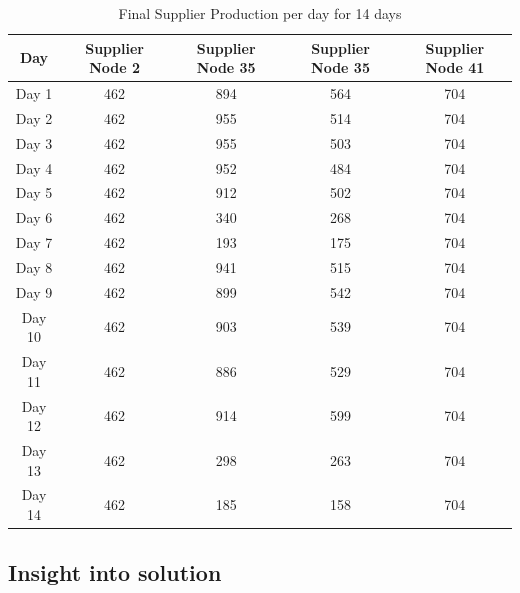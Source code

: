 \documentclass{article}
\begin{document}
\renewcommand\baselinestretch{1.5}
\begin{table}[h]
    \centering
    \color{black}
    \begin{tabular}{|c:c:c:c:c|}
        \hline
        \textbf{Day} & \textbf{Supplier Node 2} & \textbf{Supplier Node 35} & \textbf{Supplier Node 35} & \textbf{Supplier Node 41} \\ \hline
        Day 1 & 462 & 894 & 564 & 704 \\ \hdashline
        Day 2 & 462 & 955 & 514 & 704 \\ \hdashline
        Day 3 & 462 & 955 & 503 & 704 \\ \hdashline
        Day 4 & 462 & 952 & 484 & 704 \\ \hdashline
        Day 5 & 462 & 912 & 502 & 704 \\ \hdashline
        Day 6 & 462 & 340 & 268 & 704 \\ \hdashline
        Day 7 & 462 & 193 & 175 & 704 \\ \hdashline
        Day 8 & 462 & 941 & 515 & 704 \\ \hdashline
        Day 9 & 462 & 899 & 542 & 704 \\ \hdashline
        Day 10 & 462 & 903 & 539 & 704 \\ \hdashline
        Day 11 & 462 & 886 & 529 & 704 \\ \hdashline
        Day 12 & 462 & 914 & 599 & 704 \\ \hdashline
        Day 13 & 462 & 298 & 263 & 704 \\ \hdashline
        Day 14 & 462 & 185 & 158 & 704 \\ \hline
    \end{tabular}
    \caption{Final Supplier Production per day for 14 days}
    \label{tab:gasgenb}
\end{table}
\renewcommand\baselinestretch{1}

\newpage
\bigskip
\subsection{Insight into solution}

\bigskip
\end{document}
